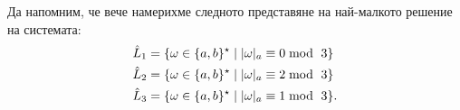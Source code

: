 \begin{example}
  Да напомним, че вече намерихме следното представяне на най-малкото решение на системата:
  \begin{align*}
    \hat{L}_1 & = \{\omega \in \{a,b\}^\star \mid \vert{\omega}\vert_{a} \equiv 0 \bmod\ 3\}\\
    \hat{L}_2 & = \{\omega \in \{a,b\}^\star \mid \vert{\omega}\vert_{a} \equiv 2 \bmod\ 3\}\\
    \hat{L}_3 & = \{\omega \in \{a,b\}^\star \mid \vert{\omega}\vert_{a} \equiv 1 \bmod\ 3\}.
  \end{align*}
\end{example}

